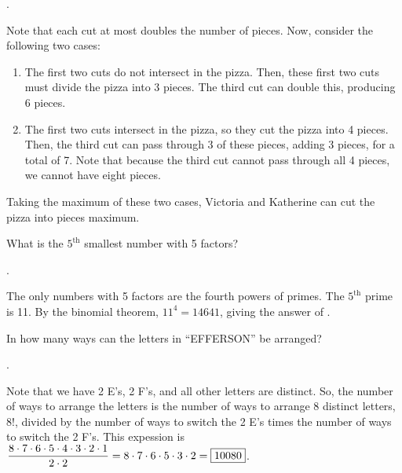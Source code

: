 \documentclass[11pt]{article}
\DeclareRobustCommand{\frac}[3][0pt]{%
  {\begingroup\hspace{#1}#2\hspace{#1}\endgroup\over\hspace{#1}#3\hspace{#1}}}
\begin{document}
\begin{answer} . \end{answer}
\begin{solution}
Note that each cut at most doubles the number of pieces. Now, consider the following two cases:
\begin{enumerate}
\item The first two cuts do not intersect in the pizza. Then, these first two cuts must divide the pizza into 3 pieces. The third cut can double this, producing 6 pieces.
\item The first two cuts intersect in the pizza, so they cut the pizza into 4 pieces. Then, the third cut can pass through 3 of these pieces, adding 3 pieces, for a total of 7. Note that because the third cut cannot pass through all 4 pieces, we cannot have eight pieces.
\end{enumerate}
Taking the maximum of these two cases, Victoria and Katherine can cut the pizza into  pieces maximum.
\end{solution}

\begin{problem} What is the  $5^{\text{th}}$ smallest number with 5 factors?
\end{problem}

\begin{answer} . \end{answer}
\begin{solution}
The only numbers with 5 factors are the fourth powers of primes. The $5^{\text{th}}$ prime is 11. By the binomial theorem, $11^4 = 14641$, giving the answer of .
\end{solution}

\begin{problem} In how many ways can the letters in ``EFFERSON'' be arranged?
\end{problem}

\begin{answer} . \end{answer}
\begin{solution}
Note that we have 2 E's, 2 F's, and all other letters are distinct. So, the number of ways to arrange the letters is the number of ways to arrange 8 distinct letters, 8!, divided by the number of ways to switch the 2 E's times the number of ways to switch the 2 F's. This expession is $\displaystyle \frac{8 \cdot 7 \cdot 6 \cdot 5 \cdot 4 \cdot 3 \cdot 2 \cdot 1}{2 \cdot 2} = 8 \cdot 7 \cdot 6 \cdot 5 \cdot 3 \cdot 2 = \boxed{10080}$.
\end{solution}
\end{document}
